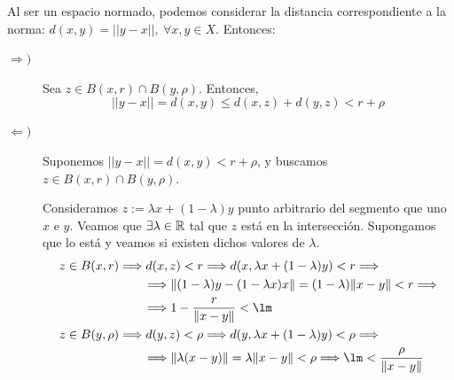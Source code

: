 \begin{ejercicio}
\begin{enumerate}
        Al ser un espacio normado, podemos considerar la distancia correspondiente a la norma: $d(x,y)=||y-x||,~\forall x,y\in X$. Entonces:
        \begin{description}
            \item[$\Longrightarrow)$]
            Sea $z\in B(x,r)\cap B(y,\rho)$. Entonces,
            \begin{equation*}
                ||y-x|| = d(x,y) \leq d(x,z)+ d(y,z)<r + \rho
            \end{equation*}

            \item[$\Longleftarrow)$]
            Suponemos $||y-x||=d(x,y)<r+\rho$, y buscamos $z\in B(x,r)\cap B(y,\rho)$.\\

            Consideramos $z:= \lambda x+(1-\lambda)y$ punto arbitrario del segmento que uno $x$ e $y$. Veamos que $\exists \lambda\in \mathbb{R}$ tal que $z$ está en la intersección. Supongamos que lo está y veamos si existen dichos valores de $\lambda$.
            \begin{equation*}\begin{split}
                z\in B(x,r)&\Longrightarrow d(x,z)<r \Longrightarrow d(x,\lambda x +(1-\lambda)y)<r  \Longrightarrow \\
                & \qquad \Longrightarrow \|(1-\lambda)y -(1-\lambda x)x\| = (1-\lambda)\|x-y\|<r \Longrightarrow \\
                & \qquad \Longrightarrow 1-\frac{r}{\|x-y\|}<\lm\\
                z\in B(y,\rho)&\Longrightarrow d(y,z)<\rho \Longrightarrow d(y,\lambda x +(1-\lambda)y)<\rho \Longrightarrow \\
                & \qquad \Longrightarrow \|\lambda(x-y)\| = \lambda \|x-y\|<\rho \Longrightarrow \lm < \frac{\rho}{\|x-y\|}
            \end{split}\end{equation*}


\end{description}
\end{enumerate}
\end{ejercicio}
